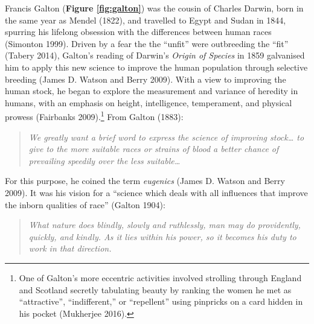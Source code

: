 \documentclass[
]{book}
\begin{document}
Francis Galton (\textbf{Figure \ref{fig:galton}}) was the cousin of Charles Darwin, born in the same year as Mendel (1822), and travelled to Egypt and Sudan in 1844, spurring his lifelong obsession with the differences between human races (Simonton 1999). Driven by a fear the the ``unfit'' were outbreeding the ``fit'' (Tabery 2014), Galton's reading of Darwin's \emph{Origin of Species} in 1859 galvanised him to apply this new science to improve the human population through selective breeding (James D. Watson and Berry 2009). With a view to improving the human stock, he began to explore the measurement and variance of heredity in humans, with an emphasis on height, intelligence, temperament, and physical prowess (Fairbanks 2009).\footnote{One of Galton's more eccentric activities involved strolling through England and Scotland secretly tabulating beauty by ranking the women he met as ``attractive'', ``indifferent,'' or ``repellent'' using pinpricks on a card hidden in his pocket (Mukherjee 2016).} From Galton (1883):

\begin{quote}
\emph{We greatly want a brief word to express the science of improving stock\ldots{} to give to the more suitable races or strains of blood a better chance of prevailing speedily over the less suitable\ldots{}}
\end{quote}

For this purpose, he coined the term \emph{eugenics} (James D. Watson and Berry 2009). It was his vision for a ``science which deals with all influences that improve the inborn qualities of race'' (Galton 1904):

\begin{quote}
\emph{What nature does blindly, slowly and ruthlessly, man may do providently, quickly, and kindly. As it lies within his power, so it becomes his duty to work in that direction.}
\end{quote}
\end{document}

